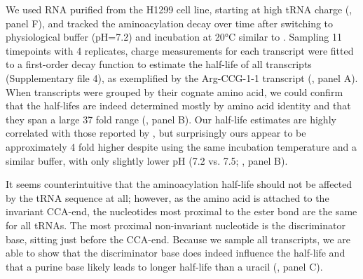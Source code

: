 \documentclass[9pt,lineno]{elife}
\begin{document}
We used RNA purified from the H1299 cell line, starting at high tRNA charge (, panel F), and tracked the aminoacylation decay over time after switching to physiological buffer (pH=7.2) and incubation at 20°C similar to \cite{Peacock2014-wk}.
Sampling 11 timepoints with 4 replicates, charge measurements for each transcript were fitted to a first-order decay function to estimate the half-life of all transcripts (Supplementary file 4), as exemplified by the Arg-CCG-1-1 transcript (, panel A).
When transcripts were grouped by their cognate amino acid, we could confirm that the half-lifes are indeed determined mostly by amino acid identity and that they span a large 37 fold range (, panel B).
Our half-life estimates are highly correlated with those reported by \cite{Peacock2014-wk}, but surprisingly ours appear to be approximately 4 fold higher despite using the same incubation temperature and a similar buffer, with only slightly lower pH (7.2 vs. 7.5; , panel B).

It seems counterintuitive that the aminoacylation half-life should not be affected by the tRNA sequence at all; however, as the amino acid is attached to the invariant CCA-end, the nucleotides most proximal to the ester bond are the same for all tRNAs.
The most proximal non-invariant nucleotide is the discriminator base, sitting just before the CCA-end.
Because we sample all transcripts, we are able to show that the discriminator base does indeed influence the half-life and that a purine base likely leads to longer half-life than a uracil (, panel C).
\end{document}
